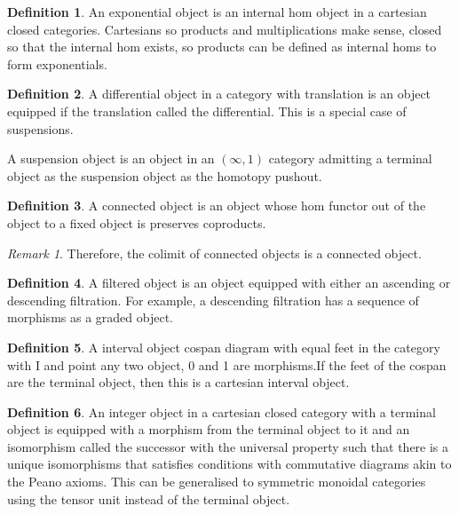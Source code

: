 \documentclass[10pt]{article}
\theoremstyle{plain}%
\theoremstyle{definition}
\newtheorem{definition}{Definition}[section]
\theoremstyle{remark}
\newtheorem*{remark}{Remark}
\begin{document}
\begin{definition}
    An exponential object is an internal hom object in a cartesian closed categories. Cartesians so products and multiplications make sense, closed so that the internal hom exists, so products can be defined as internal homs to form exponentials.
\end{definition}

\begin{definition}
    A differential object in a category with translation is an object equipped if the translation called the differential. This is a special case of suspensions.

    A suspension object is an object in an $(\infty,1)$ category admitting a terminal object as the suspension object as the homotopy pushout.
\end{definition}

\begin{definition}
    A connected object is an object whose hom functor out of the object to a fixed object is preserves coproducts.
\end{definition}

\begin{remark}
    Therefore, the colimit of connected objects is a connected object.
\end{remark}

\begin{definition}
    A filtered object is an object equipped with either an ascending or descending filtration. For example, a descending filtration has a sequence of morphisms as a graded object.
\end{definition}

\begin{definition}
    A interval object cospan diagram with equal feet in the category with I and point any two object, 0 and 1 are morphisms.If the feet of the cospan are the terminal object, then this is a cartesian interval object.
\end{definition}

\begin{definition}
    An integer object in a cartesian closed category with a terminal object is equipped with a morphism from the terminal object to it and an isomorphism called the successor with the universal property such that there is a unique isomorphisms that satisfies conditions with commutative diagrams akin to the Peano axioms. This can be generalised to symmetric monoidal categories using the tensor unit instead of the terminal object.
\end{definition}
\end{document}
